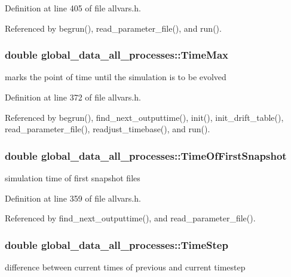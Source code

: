 Definition at line 405 of file allvars.h.



Referenced by begrun(), read\_\-parameter\_\-file(), and run().

\hypertarget{structglobal__data__all__processes_a3e22fbc2ce177c1e383e9acbbf44f8d5}{
\subsubsection[{TimeMax}]{\setlength{\rightskip}{0pt plus 5cm}double {\bf global\_\-data\_\-all\_\-processes::TimeMax}}}
\label{structglobal__data__all__processes_a3e22fbc2ce177c1e383e9acbbf44f8d5}
marks the point of time until the simulation is to be evolved 

Definition at line 372 of file allvars.h.



Referenced by begrun(), find\_\-next\_\-outputtime(), init(), init\_\-drift\_\-table(), read\_\-parameter\_\-file(), readjust\_\-timebase(), and run().

\hypertarget{structglobal__data__all__processes_a18e4063fbc1f92e8c59d6e59c7b20631}{
\subsubsection[{TimeOfFirstSnapshot}]{\setlength{\rightskip}{0pt plus 5cm}double {\bf global\_\-data\_\-all\_\-processes::TimeOfFirstSnapshot}}}
\label{structglobal__data__all__processes_a18e4063fbc1f92e8c59d6e59c7b20631}
simulation time of first snapshot files 

Definition at line 359 of file allvars.h.



Referenced by find\_\-next\_\-outputtime(), and read\_\-parameter\_\-file().

\hypertarget{structglobal__data__all__processes_a05a40a90ec77ac379054f82acbec87dc}{
\subsubsection[{TimeStep}]{\setlength{\rightskip}{0pt plus 5cm}double {\bf global\_\-data\_\-all\_\-processes::TimeStep}}}
\label{structglobal__data__all__processes_a05a40a90ec77ac379054f82acbec87dc}
difference between current times of previous and current timestep 

